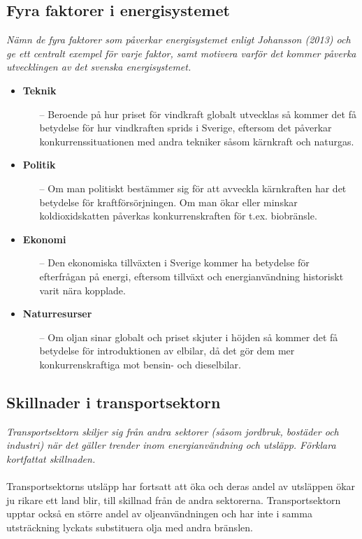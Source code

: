 \documentclass{article}
\begin{document}
\subsection{Fyra faktorer i energisystemet}

\textit{Nämn de fyra faktorer som påverkar energisystemet enligt Johansson (2013) och ge ett centralt exempel för varje faktor, samt motivera varför det kommer påverka utvecklingen av det svenska energisystemet.}

\begin{itemize}
    \item \textbf{Teknik}
    \begin{itemize}
        \item[--] Beroende på hur priset för vindkraft globalt utvecklas så kommer det få betydelse för hur vindkraften sprids i Sverige, eftersom det påverkar konkurrenssituationen med andra tekniker såsom kärnkraft och naturgas.
    \end{itemize}
    \newpage
    \item \textbf{Politik}
    \begin{itemize}
        \item[--] Om man politiskt bestämmer sig för att avveckla kärnkraften har det betydelse för kraftförsörjningen. Om man ökar eller minskar koldioxidskatten påverkas konkurrenskraften för t.ex. biobränsle.
    \end{itemize}
    \item \textbf{Ekonomi}
    \begin{itemize}
        \item[--] Den ekonomiska tillväxten i Sverige kommer ha betydelse för efterfrågan på energi, eftersom tillväxt och energianvändning historiskt varit nära kopplade.
    \end{itemize}
    \item \textbf{Naturresurser}
    \begin{itemize}
        \item[--] Om oljan sinar globalt och priset skjuter i höjden så kommer det få betydelse för introduktionen av elbilar, då det gör dem mer konkurrenskraftiga mot bensin- och dieselbilar.
    \end{itemize}
\end{itemize}

\subsection{Skillnader i transportsektorn}
\textit{Transportsektorn skiljer sig från andra sektorer (såsom jordbruk, bostäder och industri) när det gäller trender inom energianvändning och utsläpp. Förklara kortfattat skillnaden.}\\
\\
Transportsektorns utsläpp har fortsatt att öka och deras andel av utsläppen ökar ju rikare ett land blir, till skillnad från de andra sektorerna. Transportsektorn upptar också en större andel av oljeanvändningen och har inte i samma utsträckning lyckats substituera olja med andra bränslen.
\end{document}
